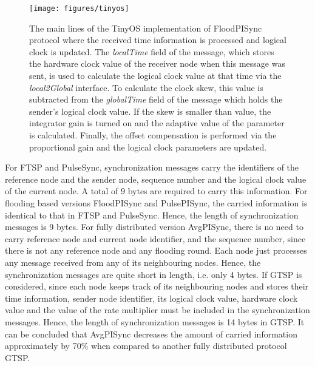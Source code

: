 \documentclass[english,a4paper,10pt,final]{article}
\numberwithin{equation}{section}
\numberwithin{figure}{section}
\begin{document}
\begin{figure}

\center

\texttt{[image: figures/tinyos]}


\caption{\label{fig:tinyos} The main lines of the TinyOS implementation of FloodPISync protocol where the received time information is processed and logical clock is updated. The \textit{localTime} field of the message, which stores the hardware clock value of the receiver node when this message was sent, is used to calculate the logical clock value at that time via the \textit{local2Global} interface. To calculate the clock skew, this value is subtracted from the \textit{globalTime} field of the message which holds the sender's logical clock value. If the skew is smaller than  value, the integrator gain is turned on and the adaptive value of the  parameter is calculated. Finally, the offset compensation is performed via the proportional gain and the logical clock parameters are updated.}
\end{figure}

For FTSP and PulseSync, synchronization messages carry the identifiers of the reference node and the sender node, sequence number and the logical clock value of the current node. A total of 9 bytes are required to carry this information. For flooding based versions FloodPISync and PulsePISync, the carried information is identical to that in FTSP and PulseSync. Hence, the length of synchronization messages is 9 bytes. For fully distributed version AvgPISync, there is no need to carry reference node and current node identifier, and the sequence number, since there is not any reference node and any flooding round. Each node just processes any message received from any of its neighbouring nodes. Hence, the synchronization messages are quite short in length, i.e. only 4 bytes. If GTSP is considered, since each node keeps track of its neighbouring nodes and stores their time information, sender node identifier, its logical clock value, hardware clock value and the value of the rate multiplier must be included in the synchronization messages. Hence, the length of synchronization messages is 14 bytes in GTSP. It can be concluded that AvgPISync decreases the amount of carried information approximately by 70\%  when compared to another fully distributed protocol GTSP. 
\end{document}
